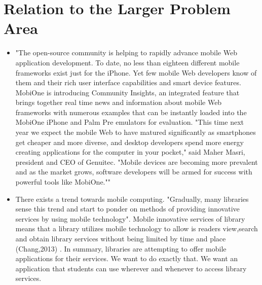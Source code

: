 \section{Relation to the Larger Problem Area}
    \begin{itemize}
        \item 
        "The open-source community is helping to rapidly advance mobile Web application development. To date, no less than eighteen different mobile frameworks exist just for the iPhone. Yet few mobile Web developers know of them and their rich user interface capabilities and smart device features. MobiOne is introducing Community Insights, an integrated feature that brings together real time news and information about mobile Web frameworks with numerous examples that can be instantly loaded into the MobiOne iPhone and Palm Pre emulators for evaluation. "This time next year we expect the mobile Web to have matured significantly as smartphones get cheaper and more diverse, and desktop developers spend more energy creating applications for the computer in your pocket," said Maher Masri, president and CEO of Genuitec. "Mobile devices are becoming more prevalent and as the market grows, software developers will be armed for success with powerful tools like MobiOne.""\cite{MobiOne}
        
        \item
        There exists a trend towards mobile computing. "Gradually, many libraries sense this trend and start to ponder on methods of providing innovative services by using mobile technology". Mobile innovative services of library means that a library utilizes mobile technology to allow is readers view,search and obtain library services without being limited by time and place (Chang,2013) \cite{pu_chiu_chen_huang_2015}. In summary, libraries are attempting to offer mobile applications for their services. We want to do exactly that. We want an application that students can use wherever and whenever to access library services.
        

\end{itemize}
